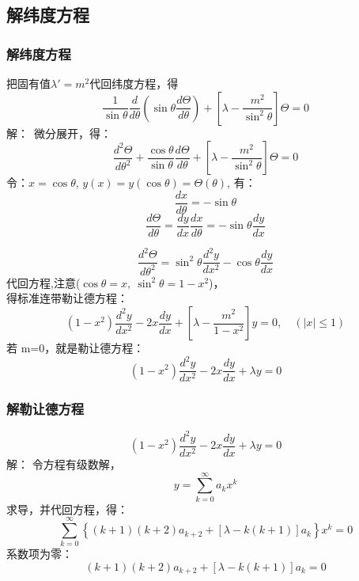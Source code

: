 \subsection{解纬度方程}
\begin{frame}
\frametitle{解纬度方程}
把固有值$\lambda'=m^2$代回纬度方程，得
\begin{equation*}
  \boxed{\frac{1}{\sin \theta} \frac{d}{d \theta}\left(\sin \theta \frac{d \Theta}{d \theta}\right)+\left[\lambda-\frac{m^{2}}{\sin ^{2} \theta}\right] \Theta=0}
\end{equation*}	
\alert{解：}~微分展开，得：
\begin{equation*}
  \frac{d^{2} \Theta}{d \theta^{2}}+\frac{\cos \theta}{\sin \theta} \frac{d \Theta}{d \theta}+\left[\lambda-\frac{m^{2}}{\sin ^{2} \theta}\right] \Theta=0
\end{equation*}		
令：$x=\cos \theta$,  $y(x)= y(\cos \theta) =\Theta (\theta)$, 有：
\begin{equation*}
  \frac{d x}{d  \theta} =-\sin \theta  
\end{equation*}		
\begin{equation*}
  \frac{d \Theta}{d \theta} =\frac{d y}{d x}\frac{d x}{d \theta} =-\sin \theta \frac{d y}{d x}
\end{equation*}		
\end{frame}	

\begin{frame}
\begin{equation*}
  \frac{ d^2 \Theta }{d \theta ^2} =\sin ^2 \theta \frac{d^2 y}{d x^2} -\cos \theta \frac{d y}{d x}
\end{equation*}		
代回方程,注意($\cos\theta =x,~ \sin ^2\theta =1-x^2 $)， \\
得标准连带勒让德方程：
\begin{equation*}
  \left(1-x^{2}\right) \frac{d^{2} y}{d x^{2}}-2 x \frac{d y}{d x}+\left[\lambda-\frac{m^{2}}{1-x^{2}}\right] y=0, \quad (|x|\le 1)
\end{equation*}		
若 m=0，就是勒让德方程：
\begin{equation*}
  \left(1-x^{2}\right) \frac{d^{2} y}{d x^{2}}-2 x \frac{d y}{d x}+\lambda y=0
\end{equation*}		
\end{frame}	

\begin{frame}
\frametitle{解勒让德方程}
\begin{equation*}
  \boxed{\left(1-x^{2}\right) \frac{d^{2} y}{d x^{2}}-2 x \frac{d y}{d x}+\lambda y=0}
\end{equation*}		
\alert{解：} 令方程有级数解，
\[ y=\sum_{k=0}^{\infty} a_k x ^k \]
求导，并代回方程，得：
\begin{equation*}
  \sum_{k=0}^{\infty}\left\{(k+1)(k+2) a_{k+2}+[\lambda-k(k+1)] a_{k}\right\} x^{k}=0
\end{equation*}	
系数项为零：
\begin{equation*}
  (k+1)(k+2) a_{k+2}+[\lambda-k(k+1)] a_{k}=0
\end{equation*}	   
\end{frame}	

